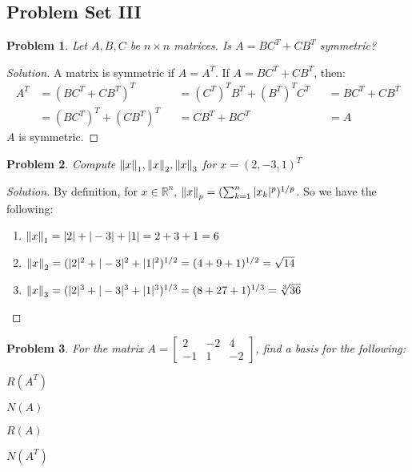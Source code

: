 \documentclass{article}
\theoremstyle{mystyle}
\newtheorem{problem}{Problem}[section]
\begin{document}
\subsection{Problem Set III}
\begin{problem}
Let $A,B,C$ be $n\times n$ matrices. Is $A = BC^T + CB^T$ symmetric?
\end{problem}
\begin{proof}[Solution]
A matrix is symmetric if $A = A^T$. If $A = BC^T+CB^T$, then:
\begin{align*}
    A^T &= (BC^T+CB^T)^T & &= (C^T)^TB^T + (B^T)^TC^T & &= BC^T + CB^T\\
    &=  (BC^T)^T + (CB^T)^T & &= CB^T + BC^T & &= A
\end{align*}
$A$ is symmetric.
\end{proof}
\begin{problem}
Compute $\norm{x}_1, \norm{x}_2, \norm{x}_3$ for $x = (2,-3,1)^T$
\end{problem}
\begin{proof}[Solution]
By definition, for $x\in \mathbb{R}^n$, $\norm{x}_p = (\sum_{k=1}^{n}|x_k|^p)^{1/p}$. So we have the following:
\begin{enumerate}
    \item $\norm{x}_1 = |2|+|-3|+|1| = 2+3+1 = 6$
    \item $\norm{x}_2 = (|2|^2+|-3|^2+|1|^2)^{1/2} = (4+9+1)^{1/2} = \sqrt{14}$
    \item $\norm{x}_3 = (|2|^3+|-3|^3+|1|^3)^{1/3} = (8+27+1)^{1/3} = \sqrt[3]{36}$
\end{enumerate}
\end{proof}
\begin{problem}
For the matrix $A = \begin{bmatrix} 2 & -2 & 4 \\ -1 & 1 & -2 \end{bmatrix}$, find a basis for the following:
\begin{enumerate}
\begin{multicols}{4}
    \item $R(A^T)$
    \item $N(A)$
    \item $R(A)$
    \item $N(A^T)$
\end{multicols}
\end{enumerate}
\end{problem}
\end{document}

